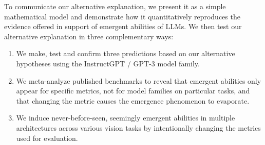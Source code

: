 To communicate our alternative explanation, we present it as a simple mathematical model and demonstrate how it quantitatively reproduces the evidence offered in support of emergent abilities of LLMs. We then test our alternative explanation in three complementary ways:
%
\begin{enumerate}
    \item We make, test and confirm three predictions based on our alternative hypotheses using the InstructGPT \cite{lowe2022instruct} / GPT-3 \cite{brown2020language} model family.
    \item We meta-analyze published benchmarks \cite{srivastava2022beyond, wei2022emergent} to reveal that emergent abilities only appear for specific metrics, not for model families on particular tasks, and that changing the metric causes the emergence phenomenon to evaporate.
    \item We induce never-before-seen, seemingly emergent abilities in multiple architectures across various vision tasks by intentionally changing the metrics used for evaluation.
\end{enumerate}

